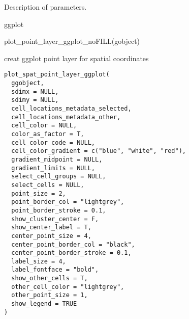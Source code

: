 \documentclass[a4paper]{book}
\begin{document}
%
\begin{Details}\relax
Description of parameters.
\end{Details}
%
\begin{Value}
ggplot
\end{Value}
%
\begin{Examples}
\begin{ExampleCode}
    plot_point_layer_ggplot_noFILL(gobject)
\end{ExampleCode}
\end{Examples}
%
\begin{Description}\relax
creat ggplot point layer for spatial coordinates
\end{Description}
%
\begin{Usage}
\begin{verbatim}
plot_spat_point_layer_ggplot(
  ggobject,
  sdimx = NULL,
  sdimy = NULL,
  cell_locations_metadata_selected,
  cell_locations_metadata_other,
  cell_color = NULL,
  color_as_factor = T,
  cell_color_code = NULL,
  cell_color_gradient = c("blue", "white", "red"),
  gradient_midpoint = NULL,
  gradient_limits = NULL,
  select_cell_groups = NULL,
  select_cells = NULL,
  point_size = 2,
  point_border_col = "lightgrey",
  point_border_stroke = 0.1,
  show_cluster_center = F,
  show_center_label = T,
  center_point_size = 4,
  center_point_border_col = "black",
  center_point_border_stroke = 0.1,
  label_size = 4,
  label_fontface = "bold",
  show_other_cells = T,
  other_cell_color = "lightgrey",
  other_point_size = 1,
  show_legend = TRUE
)
\end{verbatim}
\end{Usage}
%
\end{document}
